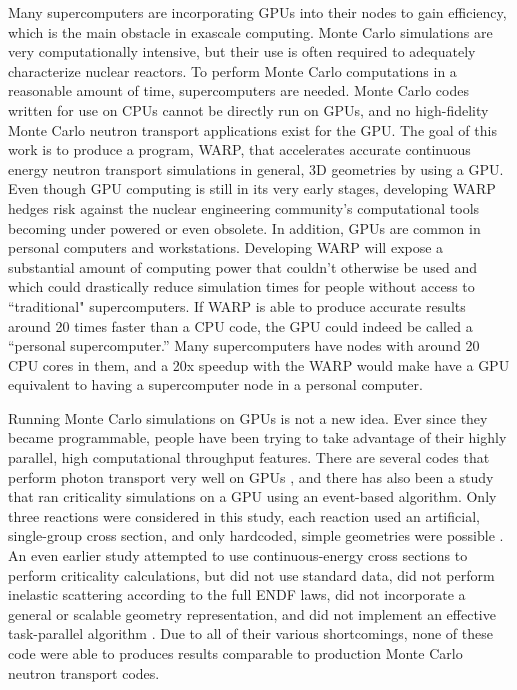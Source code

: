 Many supercomputers are incorporating GPUs into their nodes to gain efficiency, which is the main obstacle in exascale computing.  Monte Carlo simulations are very computationally intensive, but their use is often required to adequately characterize nuclear reactors.  To perform Monte Carlo computations in a reasonable amount of time, supercomputers are needed.  Monte Carlo codes written for use on CPUs cannot be directly run on GPUs, and no high-fidelity Monte Carlo neutron transport applications exist for the GPU.   The goal of this work is to produce a program, WARP, that accelerates accurate continuous energy neutron transport simulations in general, 3D geometries by using a GPU.  Even though GPU computing is still in its very early stages, developing WARP hedges risk against the nuclear engineering community's computational tools becoming under powered or even obsolete. In addition, GPUs are common in personal computers and workstations.  Developing WARP will expose a substantial amount of  computing power that couldn't otherwise be used and which could drastically reduce simulation times for people without access to ``traditional" supercomputers.  If WARP is able to produce accurate results around 20 times faster than a CPU code, the GPU could indeed be called a ``personal supercomputer.''   Many supercomputers have nodes with around 20 CPU cores in them, and a 20x speedup with the WARP would make have a GPU equivalent to having a supercomputer node in a personal computer.

Running Monte Carlo simulations on GPUs is not a new idea.  Ever since they became programmable, people have been trying to take advantage of their highly parallel, high computational throughput features.  There are several codes that perform photon transport very well on GPUs \cite{henderson, tianyu}, and there has also been a study that ran criticality simulations on a GPU using an event-based algorithm.  Only three reactions were considered in this study, each reaction used an artificial, single-group cross section, and only hardcoded, simple geometries were possible \cite{tianyu}.  An even earlier study attempted to use continuous-energy cross sections to perform criticality calculations, but did not use standard data, did not perform inelastic scattering according to the full ENDF laws, did not incorporate a general or scalable geometry representation, and did not implement an effective task-parallel algorithm \cite{nelson}.  Due to all of their various shortcomings, none of these code were able to produces results comparable to production Monte Carlo neutron transport codes.

